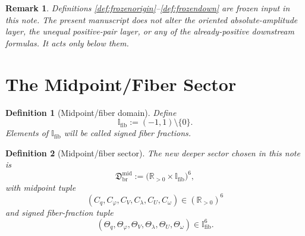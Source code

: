 \documentclass[11pt]{article}
\newcommand{\MidFiberSector}{\mathfrak D_{\mathrm{br}}^{\mathrm{mid}}}
\newcommand{\MidRead}{C_{q}}
\newcommand{\MidCov}{C_{\varphi}}
\newcommand{\MidRelax}{C_{V}}
\newcommand{\MidWell}{C_{\lambda}}
\newcommand{\MidEq}{C_{U}}
\newcommand{\MidScale}{C_{\omega}}
\newcommand{\FiberRead}{\Theta_{q}}
\newcommand{\FiberCov}{\Theta_{\varphi}}
\newcommand{\FiberRelax}{\Theta_{V}}
\newcommand{\FiberWell}{\Theta_{\lambda}}
\newcommand{\FiberEq}{\Theta_{U}}
\newcommand{\FiberScale}{\Theta_{\omega}}
\newcommand{\FiberDom}{\mathbb I_{\mathrm{fib}}}
\newtheorem{definition}{Definition}
\newtheorem{remark}{Remark}
\begin{document}
\begin{remark}
Definitions \ref{def:frozenorigin}--\ref{def:frozendown} are frozen input in this note. The present manuscript does not alter the oriented absolute-amplitude layer, the unequal positive-pair layer, or any of the already-positive downstream formulas. It acts only below them.
\end{remark}

\section{The Midpoint/Fiber Sector}

\begin{definition}[Midpoint/fiber domain]
\label{def:fiberdom}
Define
\begin{equation}
\FiberDom:=(-1,1)\setminus\{0\}.
\label{eq:fiberdom}
\end{equation}
Elements of \(\FiberDom\) will be called signed fiber fractions.
\end{definition}

\begin{definition}[Midpoint/fiber sector]
\label{def:midsector}
The new deeper sector chosen in this note is
\begin{equation}
\MidFiberSector
:=
\bigl(\mathbb R_{>0}\times\FiberDom\bigr)^{6},
\label{eq:midsector}
\end{equation}
with midpoint tuple
\begin{equation}
(\MidRead,\MidCov,\MidRelax,\MidWell,\MidEq,\MidScale)\in(\mathbb R_{>0})^{6}
\label{eq:midcoords}
\end{equation}
and signed fiber-fraction tuple
\begin{equation}
(\FiberRead,\FiberCov,\FiberRelax,\FiberWell,\FiberEq,\FiberScale)\in\FiberDom^{6}.
\label{eq:fibercoords}
\end{equation}
\end{definition}
\end{document}
